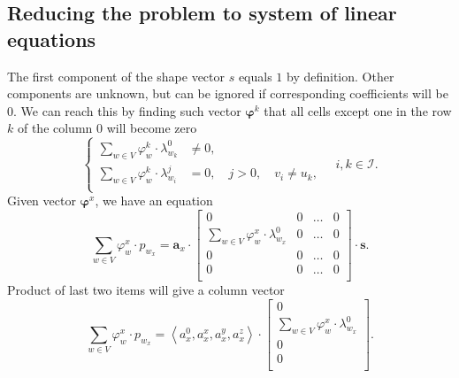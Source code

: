 \subsection{Reducing the problem to system of linear equations}
The first component of the shape vector $s$ equals $1$ by definition.
Other components are unknown,
but can be ignored if corresponding coefficients will be $0$.
We can reach this by finding such vector $\pmb{\varphi}^k$
that all cells except one in the row $k$ of the column $0$ will become zero
\begin{equation*}
  \left\{\begin{aligned}
    \sum\limits_{w \in V} \varphi_w^k \cdot \lambda_{w_k}^0 &\neq 0, \\
    \sum\limits_{w \in V} \varphi_w^k \cdot \lambda_{w_i}^j &= 0,
      \quad j > 0,
      \quad v_i \neq u_k, \\
  \end{aligned}\right.
  \quad i, k \in \mathcal{I}.
\end{equation*}
Given vector $\pmb{\varphi}^x$, we have an equation
\begin{equation*}
  \sum\limits_{w \in V} \varphi_w^x \cdot p_{w_x}
  = \pmb{a}_x
    \cdot \begin{bmatrix}
      0                                     & 0 & \dots & 0 \\
      \sum\limits_{w \in V} \varphi_w^x
        \cdot \lambda^0_{w_x} & 0 & \dots   & 0 \\
      0                                     & 0 & \dots & 0 \\
      0                                     & 0 & \dots & 0 \\
    \end{bmatrix}
    \cdot \pmb{s}.
\end{equation*}
Product of last two items will give a column vector
\begin{equation*}
  \sum\limits_{w \in V} \varphi_w^x \cdot p_{w_x}
  = \left\langle a^0_x, a_x^x, a_x^y, a_x^z \right\rangle
    \cdot \begin{bmatrix}
      0 \\
      \sum\limits_{w \in V} \varphi_w^x
        \cdot \lambda^0_{w_x}               \\
      0                                     \\
      0                                     \\
    \end{bmatrix}.
\end{equation*}
